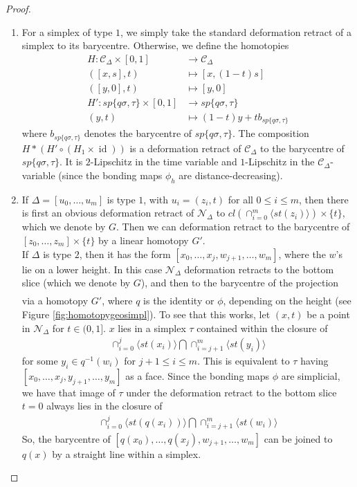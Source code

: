 \documentclass[a4paper,11pt]{article}
\theoremstyle{definition}
\theoremstyle{plain}
\theoremstyle{remark}
\DeclareMathOperator{\id}{id}
\begin{document}
\begin{proof}
\begin{enumerate}
\item For a simplex of type $1$, we simply take the standard deformation retract of a simplex to its barycentre. Otherwise, we define the homotopies
\begin{align*}
H: \mathscr{C}_{\Delta} \times [0,1]&\rightarrow \mathscr{C}_{\Delta}\\
([x,s],t)&\mapsto [x,(1-t)s]\\
([y,0],t)&\mapsto [y,0]\\
H': sp \{q\sigma,\tau\} \times [0,1]&\rightarrow sp \{q\sigma,\tau\}\\
(y,t)&\mapsto (1-t)y + t b_{sp \{q\sigma,\tau\}}
\end{align*}
where $b_{sp \{q\sigma,\tau\}}$ denotes the barycentre of $sp \{q\sigma,\tau\}$. The composition $H\ast (H'\circ (H_{1} \times \id))$ is a deformation retract of $\mathscr{C}_{\Delta}$ to the barycentre of  $sp \{q\sigma,\tau\}$. It is $2$-Lipschitz in the time variable and $1$-Lipschitz in the $\mathscr{C}_{\Delta}$-variable (since the bonding maps $\phi_{h}$ are distance-decreasing). 

\item If $\Delta = [u_0, \dots, u_m]$ is type $1$, with $u_i=(z_i,t)$ for all $0\leq i\leq m$, then there is first an obvious deformation retract of $\mathcal{N}_{\Delta}$ to  $cl(\cap_{i=0}^{m} \langle st(z_{i}) \rangle) \times \{t\}$, which we denote by $G$. Then we can deformation retract to the barycentre of $[z_{0},\dots, z_m] \times \{t\}$ by a linear homotopy $G'$. \\

If $\Delta$ is type $2$, then it has the form $[x_0,\dots,x_{j},w_{j+1},\dots, w_{m}]$, where the $w$'s lie on a lower height. In this case $\mathcal{N}_{\Delta}$ deformation retracts to the bottom slice (which we denote by $G$), and then to the barycentre of the projection 
\begin{align*}
[q(x_0),\dots, q(x_j),w_{j+1},\dots, w_{m}]
\end{align*}
via a homotopy $G'$, where $q$ is the identity or $\phi$, depending on the height (see Figure \ref{fig:homotopygeosimpl}). To see that this works, let $(x,t)$ be a point in $\mathcal{N}_{\Delta}$ for $t\in (0,1]$. $x$ lies in a simplex $\tau$ contained within the closure of 
\begin{align*}
\cap_{i=0}^{j} \langle st(x_{i}) \rangle \bigcap \cap_{i=j+1}^{m} \langle st(y_i)\rangle
\end{align*} 
for some $y_i \in q^{-1}(w_i)$ for $j+1\leq i\leq m$. This is equivalent to $\tau$ having $[x_0,\dots,x_j, y_{j+1}, \dots, y_m]$ as a face. Since the bonding maps $\phi$ are simplicial, we have that image of $\tau$ under the deformation retract to the bottom slice $t=0$ always lies in the closure of 
\begin{align*}
\cap_{i=0}^{j} \langle st(q(x_{i})) \rangle \bigcap \cap_{i=j+1}^{m} \langle st(w_i)\rangle
\end{align*}
 So, the barycentre of $[q(x_0),\dots, q(x_j),w_{j+1},\dots, w_{m}]$ can be joined to $q(x)$ by a straight line within a simplex. \\ 


\end{enumerate}
\end{proof}
\end{document}
